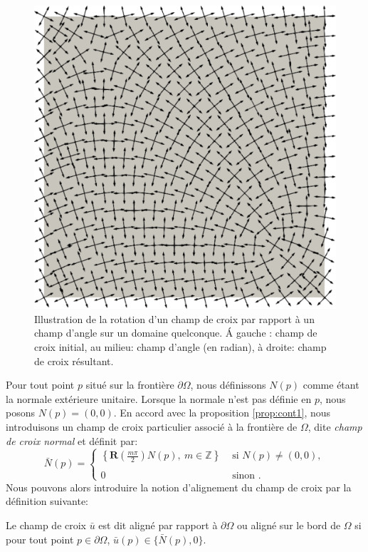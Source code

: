 \begin{figure}[!h]
  \includegraphics[scale=0.18]{images/result_field.pdf}
  \caption{Illustration de la rotation d'un champ de croix par rapport à un champ d'angle sur un domaine quelconque. \'A gauche : champ de croix initial, au milieu: champ d'angle (en radian), à droite: champ de croix résultant.}
  \label{fig:rot_cross}
\end{figure}

Pour tout point $p$ situé sur la frontière $\partial\Omega$, nous définissons $N(p)$ comme étant la normale extérieure unitaire. Lorsque la normale n'est pas définie en $p$, nous posons $N(p)=(0,0)$. En accord avec la proposition \ref{prop:cont1}, nous introduisons un champ de croix particulier associé à la frontière de $\Omega$, dite \emph{champ de croix normal} et définit par:
\begin{equation}
    \bar{N}(p) =
\left\{
    \begin{array}{ll}
        \left\{\mathbf{R}\left(\frac{m\pi}{2}\right)N(p),~ m\in \mathbb{Z}\right\} &\text{ si }N(p)\neq (0,0),\\\\
        0& \text{ sinon }.
    \end{array}
\right.
\end{equation}
Nous pouvons alors introduire la notion d'alignement du champ de croix par la définition suivante:
\begin{definition}
    Le champ de croix $\bar{u}$ est dit aligné par rapport à $\partial\Omega$ ou aligné sur le bord de $\Omega$ si pour tout point $p\in\partial\Omega$, $\bar{u}(p)\in\{\bar{N}(p), 0\}$.
\end{definition}

